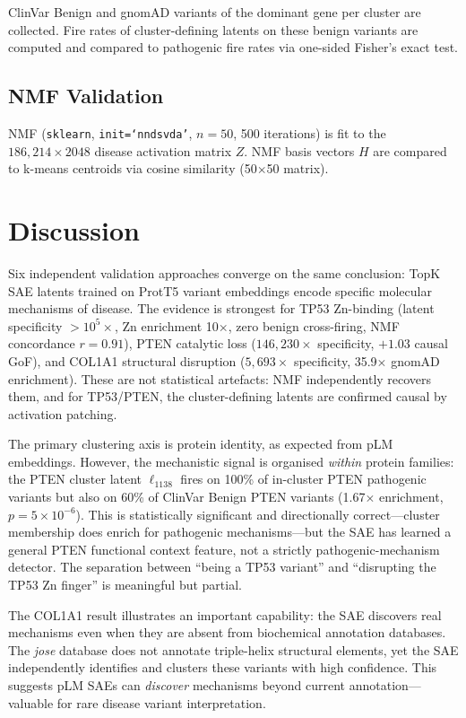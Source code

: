 \documentclass[10pt]{article}
\newcommand{\latent}[1]{$\ell_{#1}$}
\begin{document}
ClinVar Benign and gnomAD variants of the dominant gene per cluster are collected. Fire rates
of cluster-defining latents on these benign variants are computed and compared to pathogenic
fire rates via one-sided Fisher's exact test.

\subsection{NMF Validation}

NMF \citep{lee1999nmf} (\texttt{sklearn}, \texttt{init=`nndsvda'}, $n=50$, 500 iterations)
is fit to the $186{,}214 \times 2048$ disease activation matrix $Z$. NMF basis vectors $H$
are compared to k-means centroids via cosine similarity (50$\times$50 matrix).

\section{Discussion}

Six independent validation approaches converge on the same conclusion: TopK SAE latents
trained on ProtT5 variant embeddings encode specific molecular mechanisms of disease.
The evidence is strongest for TP53 Zn-binding (latent specificity $>10^5\times$, Zn
enrichment 10$\times$, zero benign cross-firing, NMF concordance $r = 0.91$), PTEN catalytic
loss ($146{,}230\times$ specificity, $+1.03$ causal GoF), and COL1A1 structural disruption
($5{,}693\times$ specificity, 35.9$\times$ gnomAD enrichment). These are not statistical
artefacts: NMF independently recovers them, and for TP53/PTEN, the cluster-defining
latents are confirmed causal by activation patching.

The primary clustering axis is protein identity, as expected from pLM embeddings. However,
the mechanistic signal is organised \emph{within} protein families: the PTEN cluster latent
\latent{1138} fires on 100\% of in-cluster PTEN pathogenic variants but also on 60\% of
ClinVar Benign PTEN variants (1.67$\times$ enrichment, $p=5\times10^{-6}$). This is
statistically significant and directionally correct---cluster membership does enrich for
pathogenic mechanisms---but the SAE has learned a general PTEN functional context feature,
not a strictly pathogenic-mechanism detector. The separation between ``being a TP53 variant''
and ``disrupting the TP53 Zn finger'' is meaningful but partial.

The COL1A1 result illustrates an important capability: the SAE discovers real mechanisms even
when they are absent from biochemical annotation databases. The \emph{jose} database does
not annotate triple-helix structural elements, yet the SAE independently identifies and
clusters these variants with high confidence. This suggests pLM SAEs can \emph{discover}
mechanisms beyond current annotation---valuable for rare disease variant interpretation.
\end{document}
